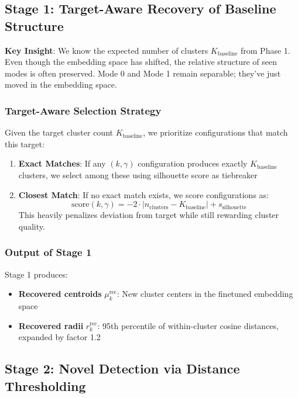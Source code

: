 \documentclass{article}
\begin{document}
\subsection{Stage 1: Target-Aware Recovery of Baseline Structure}

\textbf{Key Insight}: We know the expected number of clusters $K_{\text{baseline}}$ from Phase 1. Even though the embedding space has shifted, the relative structure of seen modes is often preserved. Mode 0 and Mode 1 remain separable; they've just moved in the embedding space.

\subsubsection{Target-Aware Selection Strategy}

Given the target cluster count $K_{\text{baseline}}$, we prioritize configurations that match this target:

\begin{enumerate}
    \item \textbf{Exact Matches}: If any $(k, \gamma)$ configuration produces exactly $K_{\text{baseline}}$ clusters, we select among these using silhouette score as tiebreaker
    \item \textbf{Closest Match}: If no exact match exists, we score configurations as:
    \begin{equation}
        \text{score}(k, \gamma) = -2 \cdot |n_{\text{clusters}} - K_{\text{baseline}}| + s_{\text{silhouette}}
    \end{equation}
    This heavily penalizes deviation from target while still rewarding cluster quality.
\end{enumerate}

\subsubsection{Output of Stage 1}

Stage 1 produces:
\begin{itemize}
    \item \textbf{Recovered centroids} $\mu_k^{\text{rec}}$: New cluster centers in the finetuned embedding space
    \item \textbf{Recovered radii} $r_k^{\text{rec}}$: 95th percentile of within-cluster cosine distances, expanded by factor 1.2
\end{itemize}

\subsection{Stage 2: Novel Detection via Distance Thresholding}
\end{document}
